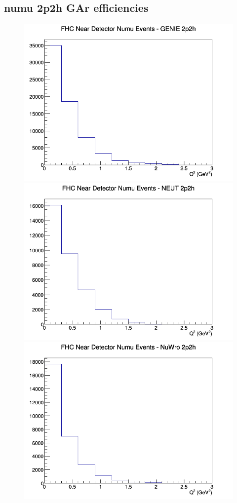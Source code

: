 \documentclass[12pt]{article}
\begin{document}
\subsection{numu 2p2h GAr efficiencies}
\begin{figure}[h]
\includegraphics[width=\linewidth]{eff_Q2/GAr/2p2h_FHC_ND_numu_Q2_GENIE.png}
\endminipage
{}
\includegraphics[width=\linewidth]{eff_Q2/GAr/2p2h_FHC_ND_numu_Q2_NEUT.png}
\endminipage
{}
\includegraphics[width=\linewidth]{eff_Q2/GAr/2p2h_FHC_ND_numu_Q2_NuWro.png}

\end{figure}
\end{document}

